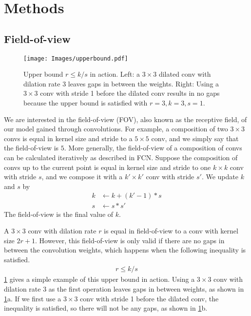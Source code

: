 \documentclass[10pt,twocolumn,letterpaper]{article}
\begin{document}
\section{Methods}

\subsection{Field-of-view}
\label{sec:fov}
\begin{figure}
  \centering
    \texttt{[image: Images/upperbound.pdf]}

   \caption{Upper bound $r\leq k/s$ in action. Left: a $3\times 3$ dilated conv with dilation rate 3 leaves gaps in between the weights. Right: Using a $3\times 3$ conv with stride 1 before the dilated conv results in no gaps because the upper bound is satisfied with $r=3,k=3,s=1$.}
   \label{fig:upperbound}
\end{figure}

We are interested in the field-of-view (FOV), also known as the receptive field, of our model gained through convolutions. For example, a composition of two $3\times 3$ convs is equal in kernel size and stride to a $5\times 5$ conv, and we simply say that the field-of-view is $5$. More generally, the field-of-view of a composition of convs can be calculated iteratively as described in FCN\cite{fcn}. Suppose the composition of convs up to the current point is equal in kernel size and stride to one $k\times k$ conv with stride $s$, and we compose it with a $k'\times k'$ conv with stride $s'$. We update $k$ and $s$ by
\begin{align}
k&\leftarrow k+(k'-1)*s\\
s&\leftarrow s*s'
\end{align}
The field-of-view is the final value of $k$.

A $3\times 3$ conv with dilation rate $r$ is equal in field-of-view to a conv with kernel size $2r+1$. However, this field-of-view is only valid if there are no gaps in between the convolution weights, which happens when the following inequality is satisfied.
\begin{align}
r\leq k/s
\end{align}
\cref{fig:upperbound} gives a simple example of this upper bound in action. Using a $3\times 3$ conv with dilation rate $3$ as the first operation leaves gaps in between weights, as shown in \cref{fig:upperbound}a. If we first use a $3\times 3$ conv with stride 1 before the dilated conv, the inequality is satisfied, so there will not be any gaps, as shown in \cref{fig:upperbound}b.
\end{document}
